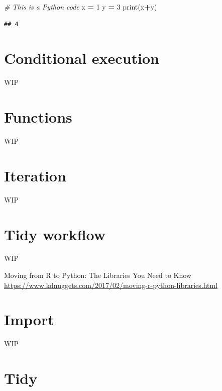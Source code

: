 \documentclass[
]{book}
\newenvironment{Shaded}{\begin{snugshade}}{\end{snugshade}}
\newcommand{\BuiltInTok}[1]{#1}
\newcommand{\CommentTok}[1]{\textcolor[rgb]{0.56,0.35,0.01}{\textit{#1}}}
\newcommand{\DecValTok}[1]{\textcolor[rgb]{0.00,0.00,0.81}{#1}}
\newcommand{\NormalTok}[1]{#1}
\newcommand{\OperatorTok}[1]{\textcolor[rgb]{0.81,0.36,0.00}{\textbf{#1}}}
\begin{document}
\begin{Shaded}
\begin{Highlighting}[]
\CommentTok{\# This is a Python code}
\NormalTok{x }\OperatorTok{=} \DecValTok{1}
\NormalTok{y }\OperatorTok{=} \DecValTok{3}
\BuiltInTok{print}\NormalTok{(x}\OperatorTok{+}\NormalTok{y)}
\end{Highlighting}
\end{Shaded}

\begin{verbatim}
## 4
\end{verbatim}

\hypertarget{conditional-execution}{%
\chapter{Conditional execution}\label{conditional-execution}}

WIP

\hypertarget{functions}{%
\chapter{Functions}\label{functions}}

WIP

\hypertarget{iteration}{%
\chapter{Iteration}\label{iteration}}

WIP

\hypertarget{tidy-workflow}{%
\chapter{Tidy workflow}\label{tidy-workflow}}

WIP

Moving from R to Python: The Libraries You Need to Know \url{https://www.kdnuggets.com/2017/02/moving-r-python-libraries.html}

\hypertarget{import}{%
\chapter{Import}\label{import}}

WIP

\hypertarget{tidy}{%
\chapter{Tidy}\label{tidy}}
\end{document}
